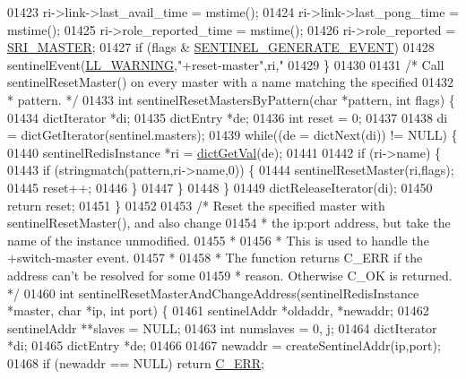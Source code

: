 \begin{DoxyCode}
{{{{{{{{{{{{{{{{01423     ri->link->last\_avail\_time = mstime();
01424     ri->link->last\_pong\_time = mstime();
01425     ri->role\_reported\_time = mstime();
01426     ri->role\_reported = \hyperlink{sentinel_8c_a2ee83e5ff67b45746cd6a310f15334b2}{SRI\_MASTER};
01427     \textcolor{keywordflow}{if} (flags & \hyperlink{sentinel_8c_a824209bfd4f15f07b6555fb19d8ba328}{SENTINEL\_GENERATE\_EVENT})
01428         sentinelEvent(\hyperlink{server_8h_a31229b9334bba7d6be2a72970967a14b}{LL\_WARNING},\textcolor{stringliteral}{"+reset-master"},ri,\textcolor{stringliteral}{"%
01429 \}
01430 
01431 \textcolor{comment}{/* Call sentinelResetMaster() on every master with a name matching the specified}
01432 \textcolor{comment}{ * pattern. */}
01433 \textcolor{keywordtype}{int} sentinelResetMastersByPattern(\textcolor{keywordtype}{char} *pattern, \textcolor{keywordtype}{int} flags) \{
01434     dictIterator *di;
01435     dictEntry *de;
01436     \textcolor{keywordtype}{int} reset = 0;
01437 
01438     di = dictGetIterator(sentinel.masters);
01439     \textcolor{keywordflow}{while}((de = dictNext(di)) != NULL) \{
01440         sentinelRedisInstance *ri = \hyperlink{dict_8h_ae8d2cc391873b2bea2b87c4f80f43120}{dictGetVal}(de);
01441 
01442         \textcolor{keywordflow}{if} (ri->name) \{
01443             \textcolor{keywordflow}{if} (stringmatch(pattern,ri->name,0)) \{
01444                 sentinelResetMaster(ri,flags);
01445                 reset++;
01446             \}
01447         \}
01448     \}
01449     dictReleaseIterator(di);
01450     \textcolor{keywordflow}{return} reset;
01451 \}
01452 
01453 \textcolor{comment}{/* Reset the specified master with sentinelResetMaster(), and also change}
01454 \textcolor{comment}{ * the ip:port address, but take the name of the instance unmodified.}
01455 \textcolor{comment}{ *}
01456 \textcolor{comment}{ * This is used to handle the +switch-master event.}
01457 \textcolor{comment}{ *}
01458 \textcolor{comment}{ * The function returns C\_ERR if the address can't be resolved for some}
01459 \textcolor{comment}{ * reason. Otherwise C\_OK is returned.  */}
01460 \textcolor{keywordtype}{int} sentinelResetMasterAndChangeAddress(sentinelRedisInstance *master, \textcolor{keywordtype}{char} *ip, \textcolor{keywordtype}{int} port) \{
01461     sentinelAddr *oldaddr, *newaddr;
01462     sentinelAddr **slaves = NULL;
01463     \textcolor{keywordtype}{int} numslaves = 0, j;
01464     dictIterator *di;
01465     dictEntry *de;
01466 
01467     newaddr = createSentinelAddr(ip,port);
01468     \textcolor{keywordflow}{if} (newaddr == NULL) \textcolor{keywordflow}{return} \hyperlink{server_8h_af98ac28d5f4d23d7ed5985188e6fb7d1}{C\_ERR};
}}}}}}}}}}}}}}}}}
\end{DoxyCode}
